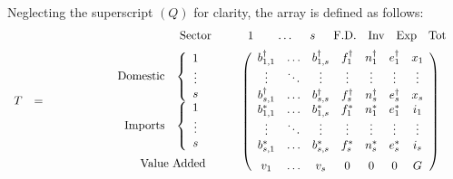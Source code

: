 \documentclass[preprint,authoryear,3p]{elsarticle}
\begin{document}
\noindent Neglecting the superscript $(Q)$ for clarity, the array is defined as follows:
$$
\begin{array}{rcc}
T & = & \begin{array}{rc}
\begin{array}{cc} \hspace*{17mm} & \mbox{Sector} \end{array} & \begin{array}{ccccccc} \; \; \; \; 1 \; \; \; \; & \mathellipsis & \; \; s \; \; & \mbox{F.D.} & \mbox{Inv} & \mbox{Exp} & \mbox{Tot} \end{array} \vspace*{2mm} \\
\begin{array}{r}
\begin{array}{rc}
\mbox{Domestic} & \left\{ \begin{array}{c}
1 \\
\vdots \\
s
\end{array} \right. \\
\mbox{Imports} & \left\{ \begin{array}{c}
1 \\
\vdots \\
s \\
\end{array} \right.
\end{array} \vspace*{2mm} \\
\begin{array}{cc} \hspace*{17mm} & \mbox{Value Added} \end{array}
\end{array} &
\left( \begin{array}{ccccccc}
b^{\dag}_{1,1} & \mathellipsis & b^{\dag}_{1,s} & f^\dag_{1} & n^\dag_{1} & e^\dag_{1} & x_1 \\
\vdots & \ddots & \vdots & \vdots & \vdots & \vdots & \vdots \\
b^{\dag}_{s,1} & \mathellipsis & b^{\dag}_{s,s} & f^\dag_{s} & n^\dag_{s} & e^\dag_{s} & x_{s} \\
b^*_{1,1} & \mathellipsis & b^*_{1,s} & f^*_{1} & n^*_{1} & e^*_{1} & i_1 \\
\vdots & \ddots & \vdots & \vdots & \vdots & \vdots & \vdots \\
b^*_{s,1} & \mathellipsis & b^*_{s,s} & f^*_{s} & n^*_{s} & e^*_{s} & i_{s} \vspace*{2mm} \\
v_{1} & \mathellipsis & v_{s} & 0 & 0 & 0 & G
\end{array} \right)
\end{array}
\end{array}
$$
\end{document}
